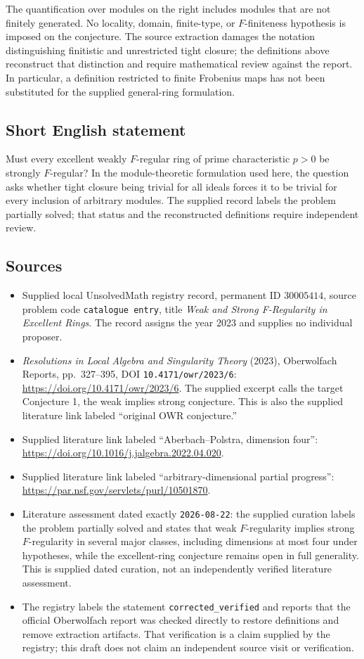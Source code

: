 \documentclass[11pt]{article}
\begin{document}
The quantification over modules on the right includes modules that are not finitely generated. No locality, domain, finite-type, or \(F\)-finiteness hypothesis is imposed on the conjecture. The source extraction damages the notation distinguishing finitistic and unrestricted tight closure; the definitions above reconstruct that distinction and require mathematical review against the report. In particular, a definition restricted to finite Frobenius maps has not been substituted for the supplied general-ring formulation.
\subsection{Short English statement}
Must every excellent weakly \(F\)-regular ring of prime characteristic \(p>0\) be strongly \(F\)-regular? In the module-theoretic formulation used here, the question asks whether tight closure being trivial for all ideals forces it to be trivial for every inclusion of arbitrary modules. The supplied record labels the problem partially solved; that status and the reconstructed definitions require independent review.
\subsection{Sources}
\begin{itemize}
\item Supplied local UnsolvedMath registry record, permanent ID \(30005414\), source problem code \texttt{catalogue entry}, title \emph{Weak and Strong F-Regularity in Excellent Rings}. The record assigns the year 2023 and supplies no individual proposer.
\item \emph{Resolutions in Local Algebra and Singularity Theory} (2023), Oberwolfach Reports, pp.\ 327--395, DOI \texttt{10.4171/owr/2023/6}: \url{https://doi.org/10.4171/owr/2023/6}. The supplied excerpt calls the target Conjecture 1, the weak implies strong conjecture. This is also the supplied literature link labeled ``original OWR conjecture.''
\item Supplied literature link labeled ``Aberbach--Polstra, dimension four'': \url{https://doi.org/10.1016/j.jalgebra.2022.04.020}.
\item Supplied literature link labeled ``arbitrary-dimensional partial progress'': \url{https://par.nsf.gov/servlets/purl/10501870}.
\item Literature assessment dated exactly \texttt{2026-08-22}: the supplied curation labels the problem partially solved and states that weak \(F\)-regularity implies strong \(F\)-regularity in several major classes, including dimensions at most four under hypotheses, while the excellent-ring conjecture remains open in full generality. This is supplied dated curation, not an independently verified literature assessment.
\item The registry labels the statement \texttt{corrected\_verified} and reports that the official Oberwolfach report was checked directly to restore definitions and remove extraction artifacts. That verification is a claim supplied by the registry; this draft does not claim an independent source visit or verification.
\end{itemize}
\end{document}
